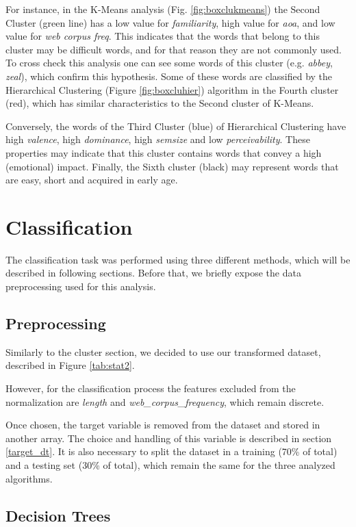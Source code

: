 \documentclass[a4paper,11pt,dvipsnames]{article}
\begin{document}
For instance, in the K-Means analysis (Fig. \ref{fig:boxclukmeans}) the Second Cluster (green line) has a low value for \textit{familiarity}, high value for \textit{aoa}, and low value for \textit{web corpus freq}. This indicates that the words that belong to this cluster may be difficult words, and for that reason they are not commonly used. To cross check this analysis one can see some words of this cluster (e.g. \textit{abbey}, \textit{zeal}), which confirm this hypothesis.
Some of these words are classified by the Hierarchical Clustering (Figure \ref{fig:boxcluhier}) algorithm in the Fourth cluster (red), which has similar characteristics to the Second cluster of K-Means.

Conversely, the words of the Third Cluster (blue) of Hierarchical Clustering have high \textit{valence}, high \textit{dominance}, high \textit{semsize} and low \textit{perceivability}. These properties may indicate that this cluster contains words that convey a high (emotional) impact. Finally, the Sixth cluster (black) may represent words that are easy, short and acquired in early age.


\section{Classification}

The classification task was performed using three different methods, which will be described in following sections. Before that, we briefly expose the data preprocessing used for this analysis.  

\subsection{Preprocessing}

Similarly to the cluster section, we decided to use our transformed dataset, described in Figure \ref{tab:stat2}. 

However, for the classification process the features excluded from the normalization are \textit{length} and \textit{web\_corpus\_frequency}, which remain discrete.

Once chosen, the target variable is removed from the dataset and stored in another array. The choice and handling of this variable is described in section \ref{target_dt}. It is also necessary to split the dataset in a training (70\% of total) and a testing set (30\% of total), which remain the same for the three analyzed algorithms.

\subsection{Decision Trees}\label{sec:decisio-tree}\label{sec:building_tree}
\end{document}
